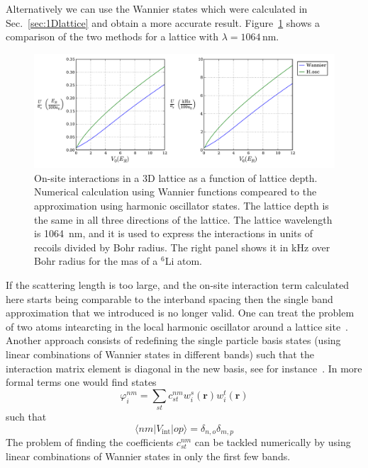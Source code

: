 \documentclass[oneside,11pt]{memoir}
\newcommand{\bv}[1]{\ensuremath{\bm{#1}}}
\begin{document}
Alternatively we can use the Wannier states which were calculated in
Sec.~\ref{sec:1Dlattice} and obtain a more accurate result.
Figure~\ref{fig:wfactor} shows a comparison of the two methods for a lattice
with $\lambda=1064$\,nm. 
\begin{figure}
\centering \includegraphics[width=\textwidth]{../figures/BandStructure_figures/wFactor_V0_a0.pdf}
\caption[On-site interactions in a 3D lattice]{\small On-site interactions in a
3D lattice as a function of lattice depth.  Numerical calculation using Wannier
functions compeared to the approximation using harmonic oscillator states.  The
lattice depth is the same in all three directions of the lattice.   The lattice
wavelength is 1064~nm, and it is used to express the interactions in units of
recoils divided by Bohr radius.  The right panel shows it in kHz over Bohr
radius for the mas of a $^{6}$Li atom.} \label{fig:wfactor}
\end{figure}

If the scattering length is too large, and the on-site interaction term
calculated here starts being comparable to the interband spacing then the
single band approximation that we introduced is no longer valid.   One can
treat the problem of two atoms intearcting in the local harmonic oscillator
around a lattice site~\cite{Busch1998}.   Another approach consists of
redefining the single particle basis states (using linear combinations of
Wannier states in different bands) such that the interaction matrix element is
diagonal in the new basis, see for instance~\cite{Jordens2010,Mark2012}. In more formal terms one would find states
\begin{equation}
 \varphi_{i }^{nm}  =  \sum_{st} c_{st}^{nm} w_{i}^{s}(\bv{r} ) w_{i}^{t}(\bv{r})
\end{equation}  
such that 
\begin{equation}
  \langle nm | V_{\mathrm{int}} | op \rangle =  \delta_{n,o}\delta_{m,p}
\end{equation}
The problem of finding the coefficients $c_{st}^{nm}$ can be tackled
numerically by using linear combinations of Wannier states in only
the first few bands. 
    
\end{document}

